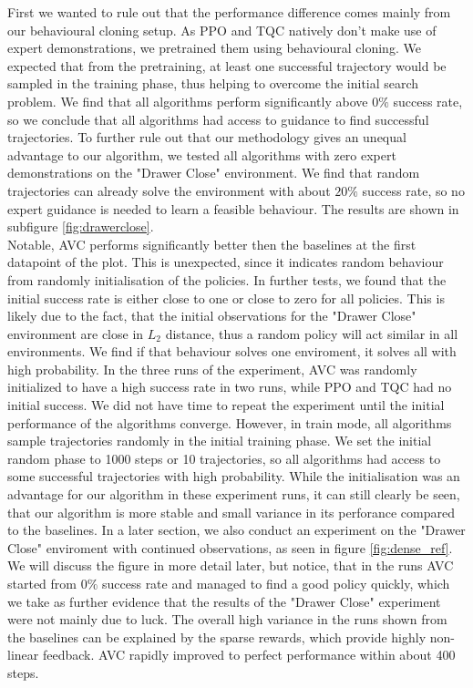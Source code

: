First we wanted to rule out that the performance difference comes mainly from our behavioural cloning setup. As PPO and TQC natively don't make use of expert demonstrations,
we pretrained them using behavioural cloning. We expected that from the pretraining, at least one successful trajectory would be sampled in the training phase, thus
helping to overcome the initial search problem. We find that all algorithms perform significantly above $0\%$ success rate, so we conclude that all algorithms had
access to guidance to find successful trajectories. To further rule out that our methodology gives an unequal advantage to our algorithm, we tested all algorithms with 
zero expert demonstrations on the 
"Drawer Close" environment. We find that random trajectories can already solve the environment with about $20\%$ success rate, so no expert guidance is needed to learn a feasible behaviour.
The results are shown in subfigure \ref{fig:drawerclose}.\\ 

Notable, AVC performs significantly better then the baselines at the first datapoint of the plot. This is unexpected, since it indicates 
random behaviour from randomly initialisation of the policies. In further tests, we found that the initial success rate is either close to one or close to zero for all policies. This is likely 
due to the fact, that the initial observations for the "Drawer Close" environment are close in $L_2$ distance, thus a random policy will act similar in all environments. We find if that behaviour 
solves one enviroment, it solves all with high probability. In the three runs of the experiment, AVC was randomly initialized to have a high success rate in two runs, while PPO and TQC had no 
initial success. We did not have time to repeat the experiment until the initial performance of the algorithms converge. However, in train mode, 
all algorithms sample trajectories randomly in the initial training phase. 
We set the initial random phase to 1000 steps or 10 trajectories, so all algorithms had access to some successful trajectories with high probability. While the initialisation was an advantage 
for our algorithm in these experiment runs, it can still clearly be seen, that our algorithm is more stable and small variance in its perforance compared to the baselines. In a later 
section, we also conduct an experiment on the "Drawer Close" enviroment with continued observations, as seen in figure \ref{fig:dense_ref}. We will discuss the figure in more detail later, but 
notice, that in the runs AVC started from $0 \%$ success rate and managed to find a good policy quickly, which we take as further evidence that the results of the "Drawer Close" experiment were not 
mainly due to luck. The overall high variance in the runs shown from the baselines can be explained by the sparse rewards, which provide highly non-linear feedback. 
AVC rapidly improved to perfect performance within about 400 steps. \\

